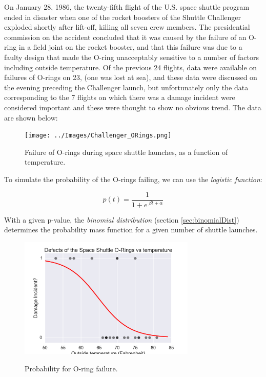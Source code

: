On January 28, 1986, the twenty-fifth flight of the U.S. space shuttle program ended in disaster when one of the rocket boosters of the Shuttle Challenger exploded shortly after lift-off, killing all seven crew members. The presidential commission on the accident concluded that it was caused by the failure of an O-ring in a field joint on the rocket booster, and that this failure was due to a faulty design that made the O-ring unacceptably sensitive to a number of factors including outside temperature. Of the previous 24 flights, data were available on failures of O-rings on 23, (one was lost at sea), and these data were discussed on the evening preceding the Challenger launch, but unfortunately only the data corresponding to the 7 flights on which there was a damage incident were considered important and these were thought to show no obvious trend. The data are shown below:

\begin{figure}[ht]
  \centering
  \texttt{[image: ../Images/Challenger\_ORings.png]}\\
  \caption{Failure of O-rings during space shuttle launches, as a function of temperature.}
\end{figure}

To simulate the probability of the O-rings failing, we can use the \emph{logistic function}:

\begin{equation}\label{eq:logisticFcn}
  p(t) = \frac{1}{ 1 + e^{ \;\beta t + \alpha } }
\end{equation}

With a given p-value, the \emph{binomial distribution} (section \ref{sec:binomialDist}) determines the probability mass function for a given number of shuttle launches.



\begin{figure}
  \centering
  \includegraphics[width=0.75\textwidth]{../Images/ChallengerPlain.png}\\
  \caption{Probability for O-ring failure.}
  \label{fig:challengerPlain}
\end{figure}

